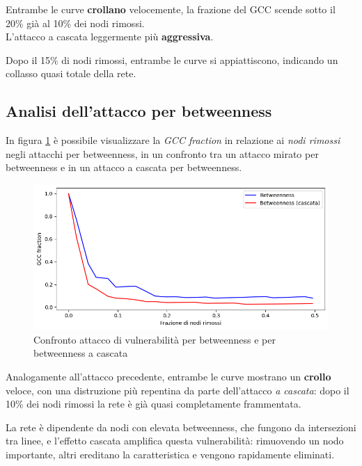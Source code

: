 Entrambe le curve \textbf{crollano} velocemente, la frazione del GCC scende sotto il 20\% già al 10\% dei nodi rimossi. \\
L'attacco a cascata leggermente più \textbf{aggressiva}. 

Dopo il 15\% di nodi rimossi, entrambe le curve si appiattiscono, indicando un collasso quasi totale della rete.

\subsection{Analisi dell'attacco per betweenness}
In figura \ref{fig: Confronto attacco di vulnerabilità per betweenness e per betweenness a cascata} è possibile visualizzare la \textit{GCC fraction} in relazione ai \textit{nodi rimossi} negli attacchi per betweenness, in un confronto tra un attacco mirato per betweenness e in un attacco a cascata per betweenness.

\vspace{1em}
\begin{figure}[h!]
    \centering
    \includegraphics[width=0.8\linewidth]{Immagini//Capitoli//cap5/atk_btw_cfr.png}
    \caption{Confronto attacco di vulnerabilità per betweenness e per betweenness a cascata}
    \label{fig: Confronto attacco di vulnerabilità per betweenness e per betweenness a cascata}
\end{figure}
\vspace{1em}

Analogamente all'attacco precedente, entrambe le curve mostrano un \textbf{crollo} veloce, con una distruzione più repentina da parte dell'attacco \textit{a cascata}: dopo il 10\% dei nodi rimossi la rete è già quasi completamente frammentata.

La rete è dipendente da nodi con elevata betweenness, che fungono da intersezioni tra linee, e l’effetto cascata amplifica questa vulnerabilità: rimuovendo un nodo importante, altri ereditano la caratteristica e vengono rapidamente eliminati.

